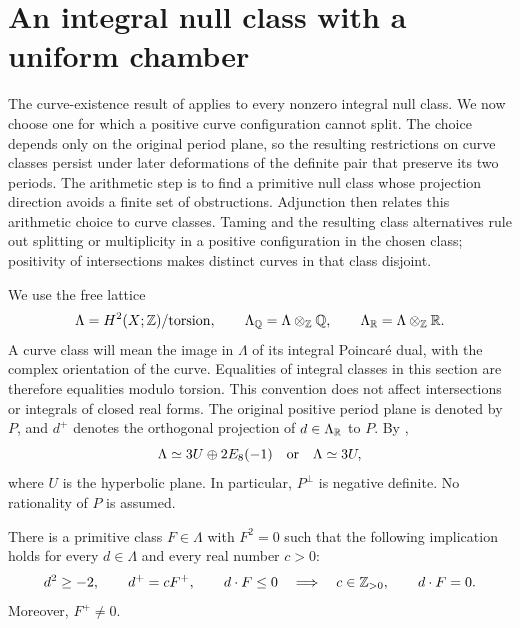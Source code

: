 \section{An integral null class with a uniform chamber}
\label{sec:lattice-chamber}

The curve-existence result of  applies to every
nonzero integral null class.  We now choose one for which a positive curve
configuration cannot split.  The choice depends only on the original
period plane, so the resulting restrictions on curve classes persist
under later deformations of the definite pair that preserve its two
periods.
The arithmetic step is to find a primitive null class whose projection
direction avoids a finite set of obstructions.  Adjunction then relates
this arithmetic choice to curve classes.  Taming and the resulting class alternatives rule out splitting or
multiplicity in a positive configuration in the chosen class; positivity
of intersections makes distinct curves in that class disjoint.

We use the free lattice
\[
  \Lambda=H^2(X;\mathbb Z)/\mathrm{torsion},\qquad
  \Lambda_{\mathbb Q}=\Lambda\otimes_{\mathbb Z}\mathbb Q,\qquad
  \Lambda_{\mathbb R}=\Lambda\otimes_{\mathbb Z}\mathbb R.
\]
A curve class will mean the image in \(\Lambda\) of its integral
Poincar\'e dual, with the complex orientation of the curve.  Equalities
of integral classes in this section are therefore equalities modulo
torsion.  This convention does not affect intersections or integrals of
closed real forms.  The original positive period plane is denoted by
\(P\), and \(d^+\) denotes the orthogonal projection of
\(d\in\Lambda_{\mathbb R}\) to \(P\).  By ,
\[
  \Lambda\simeq 3U\oplus 2E_8(-1)
  \quad\hbox{or}\quad
  \Lambda\simeq 3U,
\]
where \(U\) is the hyperbolic plane.  In particular, \(P^\perp\) is
negative definite.  No rationality of \(P\) is assumed.

\begin{proposition}
\label{prop:chamber-class}
There is a primitive class \(F\in\Lambda\) with \(F^2=0\) such that the
following implication holds for every \(d\in\Lambda\) and every real
number \(c>0\):
\begin{equation}
\label{eq:lattice-chamber-implication}
  d^2\geq-2,\qquad d^+=cF^+,\qquad d\cdot F\leq0
  \quad\Longrightarrow\quad
  c\in\mathbb Z_{>0},\qquad d\cdot F=0.
\end{equation}
Moreover, \(F^+\ne0\).
\end{proposition}

